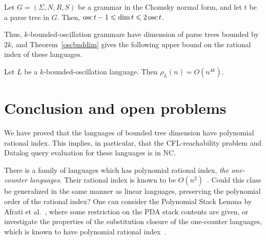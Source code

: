 \documentclass[runningheads]{llncs}
\DeclareMathOperator{\osc}{\textup{osc}}
\begin{document}
\begin{lemma}\label{boscdim}
Let $G = (\Sigma, N, R, S)$ be a grammar in the Chomsky normal form,
and let $t$ be a parse tree in $G$.
Then, $\osc t - 1 \leqslant \dim t \leqslant 2\osc t$.
\end{lemma}

Thus, $k$-bounded-oscillation grammars have dimension of parse trees bounded by $2k$,
and Theorem~\ref{oscbnddim} gives the following upper bound on the rational index
of these languages.
\begin{corollary}
Let $L$ be a $k$-bounded-oscillation language.
Then $\rho_{L}(n) = O(n^{4k})$.
\end{corollary}







\section{Conclusion and open problems}\label{section_conclusion}

We have proved that the languages of bounded tree dimension have polynomial rational index.
This implies, in particular,
that the CFL-reachability problem and Datalog query evaluation for these languages is in NC.

There is a family of languages which has polynomial rational index,
\emph{the one-counter languages}.
Their rational index is known to be $O(n^2)$~\cite{OneCount}.
Could this class be generalized in the same manner as linear languages,
preserving the polynomial order of the rational index?
One can consider the Polynomial Stack Lemma by Afrati et al.~\cite{ChainQ},
where some restriction on the PDA stack contents are given,
or investigate the properties of the substitution closure of the one-counter languages,
which is known to have polynomial rational index~\cite{RatBasic}. 

\end{document}
